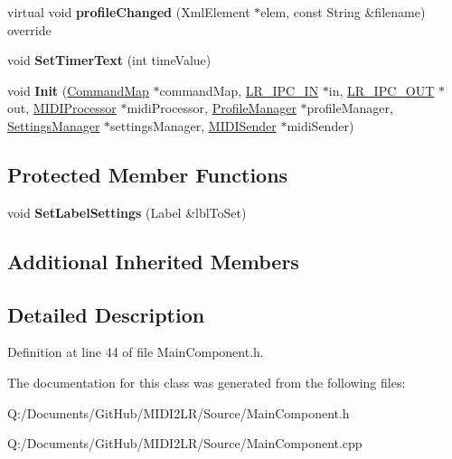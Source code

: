 \begin{DoxyCompactItemize}
\item 
virtual void {\bfseries profile\+Changed} (Xml\+Element $\ast$elem, const String \&filename) override\hypertarget{class_main_content_component_adcb1797e988cf44e5c1811a1ae8144d5}{}\label{class_main_content_component_adcb1797e988cf44e5c1811a1ae8144d5}

\item 
void {\bfseries Set\+Timer\+Text} (int time\+Value)\hypertarget{class_main_content_component_a45f89996ceeb2243081dec7964f8a8c0}{}\label{class_main_content_component_a45f89996ceeb2243081dec7964f8a8c0}

\item 
void {\bfseries Init} (\hyperlink{class_command_map}{Command\+Map} $\ast$command\+Map, \hyperlink{class_l_r___i_p_c___i_n}{L\+R\+\_\+\+I\+P\+C\+\_\+\+IN} $\ast$in, \hyperlink{class_l_r___i_p_c___o_u_t}{L\+R\+\_\+\+I\+P\+C\+\_\+\+O\+UT} $\ast$out, \hyperlink{class_m_i_d_i_processor}{M\+I\+D\+I\+Processor} $\ast$midi\+Processor, \hyperlink{class_profile_manager}{Profile\+Manager} $\ast$profile\+Manager, \hyperlink{class_settings_manager}{Settings\+Manager} $\ast$settings\+Manager, \hyperlink{class_m_i_d_i_sender}{M\+I\+D\+I\+Sender} $\ast$midi\+Sender)\hypertarget{class_main_content_component_affa458ab3832dcd7ec8cc07247492498}{}\label{class_main_content_component_affa458ab3832dcd7ec8cc07247492498}

\end{DoxyCompactItemize}
\subsection*{Protected Member Functions}
\begin{DoxyCompactItemize}
\item 
void {\bfseries Set\+Label\+Settings} (Label \&lbl\+To\+Set)\hypertarget{class_main_content_component_a3591717702eb6417ff1d2646a7b59e90}{}\label{class_main_content_component_a3591717702eb6417ff1d2646a7b59e90}

\end{DoxyCompactItemize}
\subsection*{Additional Inherited Members}


\subsection{Detailed Description}


Definition at line 44 of file Main\+Component.\+h.



The documentation for this class was generated from the following files\+:\begin{DoxyCompactItemize}
\item 
Q\+:/\+Documents/\+Git\+Hub/\+M\+I\+D\+I2\+L\+R/\+Source/Main\+Component.\+h\item 
Q\+:/\+Documents/\+Git\+Hub/\+M\+I\+D\+I2\+L\+R/\+Source/Main\+Component.\+cpp\end{DoxyCompactItemize}
